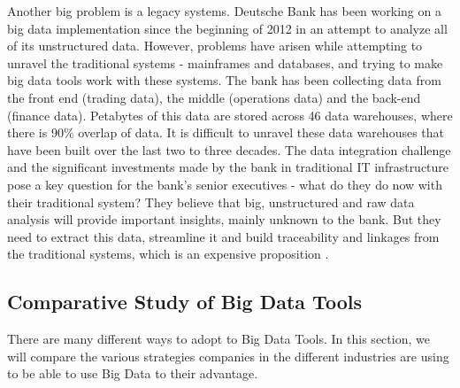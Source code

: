\documentclass[runningheads]{llncs}
\begin{document}
\begin{enumerate}
Another big problem is a legacy systems. Deutsche Bank has been working on a big data implementation since the beginning of 2012 in an attempt to analyze all of its unstructured data. However, problems have arisen while attempting to unravel the traditional systems - mainframes and databases, and trying to make big data tools work with these systems. The bank has been collecting data from the front end (trading data), the middle (operations data) and the back-end (finance data). Petabytes of this data are stored across 46 data warehouses, where there is 90\% overlap of data. It is difficult to unravel these data warehouses that have been built over the last two to three decades. The data integration challenge and the significant investments made by the bank in traditional IT infrastructure pose a key question for the bank’s senior executives - what do they do now with their traditional system? They believe that big, unstructured and raw data analysis will provide important insights, mainly unknown to the bank. But they need to extract this data, streamline it and build traceability and linkages from the traditional systems, which is an expensive proposition \cite{PREEZ}.

\end{enumerate}

\subsection{Comparative Study of Big Data Tools}
There are many different ways to adopt to Big Data Tools. In this section, we will compare the various strategies companies in the different industries are using to be able to use Big Data to their advantage.
\end{document}
